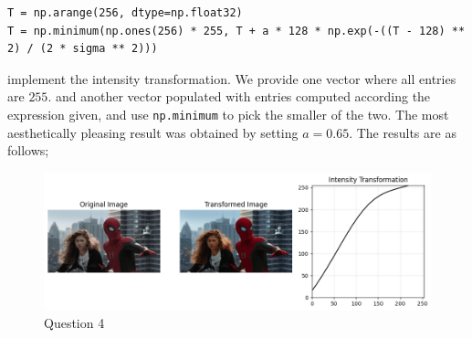 \documentclass{article}[a4paper]
\begin{document}
\begin{enumerate}
\begin{lstlisting}
T = np.arange(256, dtype=np.float32)
T = np.minimum(np.ones(256) * 255, T + a * 128 * np.exp(-((T - 128) ** 2) / (2 * sigma ** 2)))
	\end{lstlisting}
	implement the intensity transformation. We provide one vector where all entries are $255$. and another vector populated with entries
	computed according the expression given, and use \lstinline|np.minimum| to pick the smaller of the two. The most aesthetically
	pleasing result was obtained by setting $a = 0.65$. The results are as follows;

	\begin{figure}[H]
		\centering
		\includegraphics[width=0.9\linewidth]{images/q4.png}
		\caption{Question 4}
	\end{figure}	

\end{enumerate}
\end{document}
